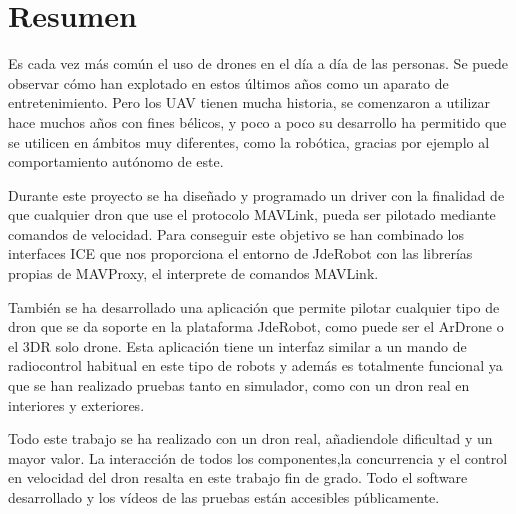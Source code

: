 \chapter*{Resumen}

\hspace{1cm} Es cada vez más común el uso de drones en el día a día de las personas. Se puede observar cómo han explotado en estos últimos años como un aparato de entretenimiento. Pero los UAV tienen mucha historia, se comenzaron a utilizar hace muchos años con fines bélicos, y poco a poco su desarrollo ha permitido que se utilicen en ámbitos muy diferentes, como la robótica, gracias por ejemplo al comportamiento autónomo de este.

\hspace{1cm} Durante este proyecto se ha diseñado y programado un driver con la finalidad de que cualquier dron que use el protocolo MAVLink, pueda ser pilotado mediante comandos de velocidad. Para conseguir este objetivo se han combinado los interfaces ICE que nos proporciona el entorno de JdeRobot con las librerías propias de MAVProxy, el interprete de comandos MAVLink. 


\hspace{1cm} También se ha desarrollado una aplicación que permite pilotar cualquier tipo de dron que se da soporte en la plataforma JdeRobot, como puede ser el ArDrone o el 3DR solo drone. Esta aplicación tiene un interfaz similar a un mando de radiocontrol habitual en este tipo de robots y además es totalmente funcional ya que se han realizado pruebas tanto en simulador, como con un dron real en interiores y exteriores.

\hspace{1cm} Todo este trabajo se ha realizado con un dron real, añadiendole dificultad y un mayor valor. La interacción de todos los componentes,la concurrencia y el control en velocidad del dron resalta en este trabajo fin de grado. Todo el software desarrollado y los vídeos de las pruebas están accesibles p\'ublicamente. 

